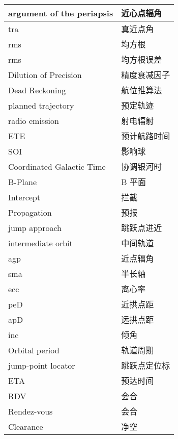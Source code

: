 \documentclass[a4paper]{article}
\theoremstyle{definition}
\begin{document}
{{\begin{longtable}{|p{4.5cm}|p{10cm}|}
	argument of the periapsis       & 近心点辐角   \\ \hline
	tra                             & 真近点角    \\ \hline
	rms                             & 均方根     \\ \hline
	rms                             & 均方根误差   \\ \hline
	Dilution of Precision           & 精度衰减因子  \\ \hline
	Dead Reckoning                  & 航位推算法   \\ \hline
	planned trajectory              & 预定轨迹    \\ \hline
	radio emission                  & 射电辐射    \\ \hline
	ETE                             & 预计航路时间  \\ \hline
	SOI                             & 影响球     \\ \hline
	Coordinated Galactic Time       & 协调银河时   \\ \hline
	B-Plane                         & B 平面    \\ \hline
	Intercept                       & 拦截      \\ \hline
	Propagation                     & 预报      \\ \hline
	jump approach                   & 跳跃点进近   \\ \hline
	intermediate orbit              & 中间轨道    \\ \hline
	agp                             & 近点辐角    \\ \hline
	sma                             & 半长轴     \\ \hline
	ecc                             & 离心率     \\ \hline
	peD                             & 近拱点距    \\ \hline
	apD                             & 远拱点距    \\ \hline
	inc                             & 倾角      \\ \hline
	Orbital period                  & 轨道周期    \\ \hline
	jump-point locator              & 跳跃点定位标  \\ \hline
	ETA                             & 预达时间    \\ \hline
	RDV                             & 会合      \\ \hline
	Rendez-vous                     & 会合      \\ \hline
	Clearance                       & 净空      \\ \hline
\end{longtable}}}
\end{document}
